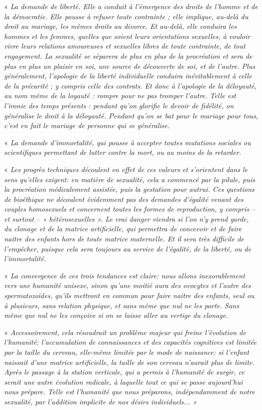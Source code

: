 « \emph{\secundo La demande de liberté. Elle a conduit à l'émergence des droits de l'homme et de la démocratie. Elle pousse à refuser toute contrainte ; elle implique, au-delà du droit au mariage, les mêmes droits au divorce. Et au-delà, elle conduira les hommes et les femmes, quelles que soient leurs orientations sexuelles, à vouloir vivre leurs relations amoureuses et sexuelles libres de toute contrainte, de tout engagement. La sexualité se séparera de plus en plus de la procréation et sera de plus en plus un plaisir en soi, une source de découverte de soi, et de l'autre. Plus généralement, l'apologie de la liberté individuelle conduira inévitablement à celle de la précarité ; y compris celle des contrats. Et donc à l'apologie de la déloyauté, au nom même de la loyauté : rompre pour ne pas tromper l'autre. Telle est l'ironie des temps présents : pendant qu'on glorifie le devoir de fidélité, on généralise le droit à la déloyauté. Pendant qu'on se bat pour le mariage pour tous, c'est en fait le mariage de personne qui se généralise.}
 
« \emph{\tertio La demande d'immortalité, qui pousse à accepter toutes mutations sociales ou scientifiques permettant de lutter contre la mort, ou au moins de la retarder.}
 
« \emph{\quarto Les progrès techniques découlent en effet de ces valeurs et s'orientent dans le sens qu'elles exigent: en matière de sexualité, cela a commencé par la pilule, puis la procréation médicalement assistée, puis la gestation pour autrui. Ces questions de bioéthique ne découlent évidemment pas des demandes d'égalité venant des couples homosexuels et concernent toutes les formes de reproduction, y compris -- et surtout -- « hétérosexuelles ». Le vrai danger viendra si l'on n'y prend garde, du clonage et de la matrice artificielle, qui permettra de concevoir et de faire naitre des enfants hors de toute matrice maternelle. Et il sera très difficile de l'empêcher, puisque cela sera toujours au service de l'égalité, de la liberté, ou de l'immortalité.}
 
« \emph{ La convergence de ces trois tendances est claire: nous allons inexorablement vers une humanité unisexe, sinon qu'une moitié aura des ovocytes et l'autre des spermatozoïdes, qu'ils mettront en commun pour faire naitre des enfants, seul ou à plusieurs, sans relation physique, et sans même que nul ne les porte. Sans même que nul ne les conçoive si on se laisse aller au vertige du clonage.}
 
« \emph{ Accessoirement, cela résoudrait un problème majeur qui freine l'évolution de l'humanité: l'accumulation de connaissances et des capacités cognitives est limitée par la taille du cerveau, elle-même limitée par le mode de naissance: si l'enfant naissait d'une matrice artificielle, la taille de son cerveau n'aurait plus de limite. Après le passage à la station verticale, qui a permis à l'humanité de surgir, ce serait une autre évolution radicale, à laquelle tout ce qui se passe aujourd'hui nous prépare. Telle est l'humanité que nous préparons, indépendamment de notre sexualité, par l'addition implicite de nos désirs individuels... » }

